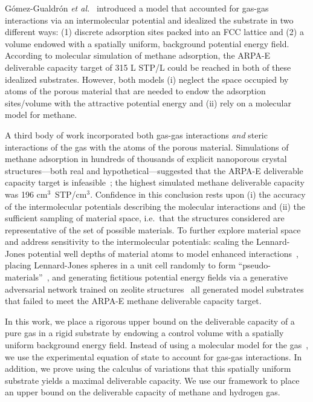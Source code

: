 \documentclass[twoside,twocolumn,9pt]{article}
\begin{document}
G\'omez-Gualdr\'on \emph{et al.}~\cite{gomez2017impact} introduced a model that
accounted for gas-gas interactions via an intermolecular potential and
idealized the substrate in two different ways: (1) discrete adsorption sites
packed into an FCC lattice and (2) a volume endowed with a spatially uniform,
background potential energy field. According to molecular simulation of methane
adsorption, the ARPA-E deliverable capacity target of 315 L STP/L could be
reached in both of these idealized substrates. However, both models (i)
neglect the space occupied by atoms of the porous material that are needed to
endow the adsorption sites/volume with the attractive potential energy and (ii)
rely on a molecular model for methane.

A third body of work incorporated both gas-gas interactions \emph{and} steric
interactions of the gas with the atoms of the porous material. Simulations of
methane adsorption in hundreds of thousands of explicit nanoporous crystal
structures---both real and hypothetical---suggested that the ARPA-E deliverable
capacity target is infeasible~\cite{simon2015materials}; the highest simulated
methane deliverable capacity was 196 cm$^3$~STP/cm$^3$. Confidence in this
conclusion rests upon (i) the accuracy of the intermolecular potentials
describing the molecular interactions and (ii) the sufficient sampling of
material space, i.e.\ that the structures considered are representative of the
set of possible materials. To further explore material space and address
sensitivity to the intermolecular potentials: scaling the Lennard-Jones
potential well depths of material atoms to model enhanced
interactions~\cite{gomez2014exploring}, placing Lennard-Jones spheres in a unit
cell randomly to form ``pseudo-materials''~\cite{kaija2018high}, and generating
fictitious potential energy fields via a generative adversarial network trained
on zeolite structures~\cite{lee2019predicting} all generated model substrates
that failed to meet the ARPA-E methane deliverable capacity target.


In this work, we place a rigorous upper bound on the deliverable capacity of a
pure gas in a rigid substrate by endowing a control volume with a spatially
uniform background energy field. Instead of using a molecular model for the
gas~\cite{gomez2017impact}, we use the experimental equation of state to
account for gas-gas interactions. In addition, we prove using the calculus of
variations that this spatially uniform substrate yields a maximal deliverable
capacity. We use our framework to place an upper bound on the deliverable
capacity of methane and hydrogen gas.
\end{document}
